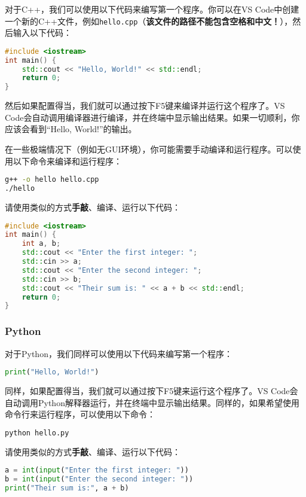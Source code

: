 \documentclass[../main.tex]{subfiles}
\begin{document}
对于C++，我们可以使用以下代码来编写第一个程序。你可以在VS Code中创建一个新的C++文件，例如\texttt{hello.cpp}（\textbf{该文件的路径不能包含空格和中文！}），然后输入以下代码：

\begin{lstlisting}[language=C++]
#include <iostream>
int main() {
    std::cout << "Hello, World!" << std::endl;
    return 0;
}
\end{lstlisting}

然后如果配置得当，我们就可以通过按下F5键来编译并运行这个程序了。VS Code会自动调用编译器进行编译，并在终端中显示输出结果。如果一切顺利，你应该会看到“Hello, World!”的输出。

在一些极端情况下（例如无GUI环境），你可能需要手动编译和运行程序。可以使用以下命令来编译和运行程序：

\begin{lstlisting}[language=bash]
g++ -o hello hello.cpp
./hello
\end{lstlisting}

请使用类似的方式\textbf{手敲}、编译、运行以下代码：

\begin{lstlisting}[language=C++]
#include <iostream>
int main() {
    int a, b;
    std::cout << "Enter the first integer: ";
    std::cin >> a;
    std::cout << "Enter the second integer: ";
    std::cin >> b;
    std::cout << "Their sum is: " << a + b << std::endl;
    return 0;
}
\end{lstlisting}

\subsubsection{Python}

对于Python，我们同样可以使用以下代码来编写第一个程序：

\begin{lstlisting}[language=Python]
print("Hello, World!")
\end{lstlisting}

同样，如果配置得当，我们就可以通过按下F5键来运行这个程序了。VS Code会自动调用Python解释器运行，并在终端中显示输出结果。同样的，如果希望使用命令行来运行程序，可以使用以下命令：

\begin{lstlisting}[language=bash]
python hello.py
\end{lstlisting}

请使用类似的方式\textbf{手敲}、编译、运行以下代码：

\begin{lstlisting}[language=Python]
a = int(input("Enter the first integer: "))
b = int(input("Enter the second integer: "))
print("Their sum is:", a + b)
\end{lstlisting}
\end{document}
